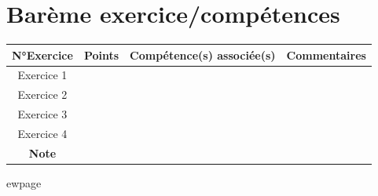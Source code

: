 \documentclass[11pt,a4paper]{article}
\begin{document}
\section*{Barème exercice/compétences}
\begin{tcolorbox}[colback=white,colframe=black,title=Critères de réussite]
\renewcommand{\arraystretch}{1.3}
\setlength{\extrarowheight}{0,3cm}
\begin{tabularx}{\linewidth}{|c|c|X|X|}
\hline
\textbf{N°Exercice} & \textbf{Points} & \textbf{Compétence(s) associée(s)}& Commentaires\\
\hline
Exercice 1 &  &
&
\\ 
\hline
Exercice 2 &  &%
&
\\
\hline
Exercice 3 &  &
&
\\
\hline
Exercice 4 &  & 
&
\\
\hline
\textbf{Note} &
\multicolumn{3}{c|}{\textbf{} 
}
\\
\hline
\end{tabularx}

\end{tcolorbox}


ewpage

    
\end{document}
